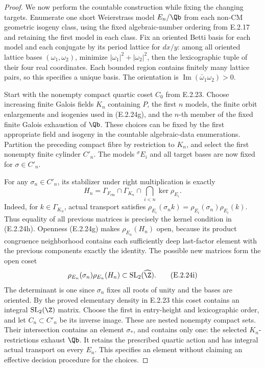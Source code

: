 \begin{proof}
We now perform the countable construction while fixing
the changing targets. Enumerate one short Weierstrass
model \(E_n/\Qb\) from each non-CM geometric isogeny
class, using the fixed algebraic-number ordering from
E.2.17 and retaining the first model in each class.
Fix an oriented Betti basis for each model and each
conjugate by its period lattice for \(dx/y\): among all
oriented lattice bases \((\omega_1,\omega_2)\), minimize
\(|\omega_1|^2+|\omega_2|^2\), then the lexicographic
tuple of their four real coordinates. Each bounded
region contains finitely many lattice pairs, so this
specifies a unique basis. The orientation is
\(\operatorname{Im}(\bar\omega_1\omega_2)>0\).

Start with the nonempty compact quartic coset \(C_0\)
from E.2.23. Choose increasing finite Galois fields
\(K_n\) containing \(P\), the first \(n\) models,
the finite orbit enlargements and isogenies used in
(E.2.24g), and the \(n\)-th member of the fixed finite
Galois exhaustion of \(\Qb\).
These choices can be fixed by the first appropriate
field and isogeny in the countable algebraic-data
enumerations. Partition the preceding compact fibre
by restriction to \(K_n\), and select the first
nonempty finite cylinder \(C'_n\).
The models \({}^{\sigma}E_i\) and all target bases
are now fixed for \(\sigma\in C'_n\).

For any \(\sigma_n\in C'_n\), its stabilizer under
right multiplication is exactly
\[
 H_n=\Gamma_{F_{\mathrm{cm}}}\cap\Gamma_{K_n}
                  \cap\bigcap_{i<n}\ker\rho_{E_i}.
 \tag{E.2.24h}
\]
Indeed, for \(k\in\Gamma_{K_n}\), actual transport
satisfies
\(\rho_{E_i}(\sigma_nk)=
\rho_{E_i}(\sigma_n)\rho_{E_i}(k)\).
Thus equality of all previous matrices is precisely
the kernel condition in (E.2.24h).
Openness (E.2.24g) makes \(\rho_{E_n}(H_n)\) open,
because its product congruence neighborhood contains
each sufficiently deep last-factor element with the
previous components exactly the identity.
The possible new matrices form the open coset
\[
 \rho_{E_n}(\sigma_n)\rho_{E_n}(H_n)
                \subset\operatorname{SL}_2(\widehat\Z).
 \tag{E.2.24i}
\]
The determinant is one since \(\sigma_n\) fixes all
roots of unity and the bases are oriented.
By the proved elementary density in E.2.23 this coset
contains an integral \(\operatorname{SL}_2(\Z)\)
matrix. Choose the first in entry-height and
lexicographic order, and let \(C_n\subset C'_n\)
be its inverse image. These are nested nonempty
compact sets. Their intersection contains an element
\(\sigma_*\), and contains only one: the selected
\(K_n\)-restrictions exhaust \(\Qb\).
It retains the prescribed quartic action and has
integral actual transport on every \(E_n\).
This specifies an element without claiming an
effective decision procedure for the choices.


\end{proof}
